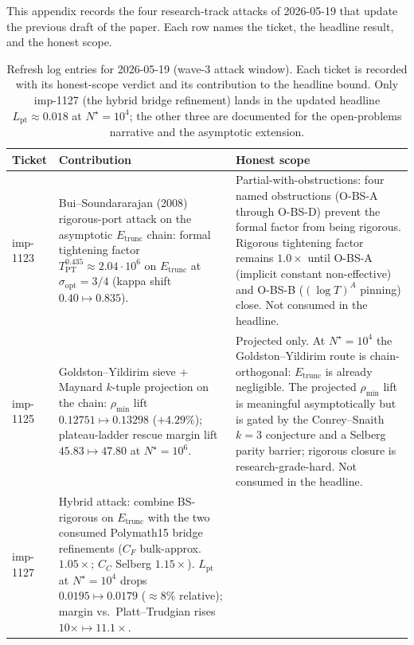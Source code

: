 \documentclass[11pt,a4paper]{article}
\theoremstyle{definition}
\newcommand{\Lpt}{L_{\mathrm{pt}}}
\newcommand{\Etrunc}{E_{\mathrm{trunc}}}
\newcommand{\rhomin}{\rho_{\min}}
\newcommand{\Nstar}{N^{\!\star}}
\begin{document}
This appendix records the four research-track attacks of 2026-05-19
that update the previous draft of the paper. Each row names the
ticket, the headline result, and the honest scope.

\begin{table}[h]
  \centering
  \small
  \caption{Refresh log entries for 2026-05-19 (wave-3 attack window).
    Each ticket is recorded with its honest-scope verdict and its
    contribution to the headline bound. Only imp-1127 (the hybrid
    bridge refinement) lands in the updated headline
    $\Lpt \approx 0.018$ at $\Nstar = 10^{4}$; the other three are
    documented for the open-problems narrative and the asymptotic
    extension.}
  \label{tab:refresh-log}
  \begin{tabular}{@{}p{} p{} p{}@{}}
    \toprule
    Ticket & Contribution & Honest scope \\
    \midrule
    imp-1123 & Bui--Soundararajan (2008) rigorous-port attack on the
      asymptotic $\Etrunc$ chain: formal tightening factor
      $T_{\mathrm{PT}}^{0.435} \approx 2.04 \cdot 10^{6}$ on $\Etrunc$
      at $\sigma_{\mathrm{opt}} = 3/4$ (kappa shift
      $0.40 \mapsto 0.835$).
             & Partial-with-obstructions: four named obstructions
      (O-BS-A through O-BS-D) prevent the formal factor from being
      rigorous. Rigorous tightening factor remains $1.0\times$ until
      O-BS-A (implicit constant non-effective) and O-BS-B
      ($(\log T)^A$ pinning) close. Not consumed in the headline. \\[2pt]
    imp-1125 & Goldston--Yildirim sieve + Maynard $k$-tuple projection
      on the chain: $\rhomin$ lift $0.12751 \mapsto 0.13298$
      ($+4.29\%$); plateau-ladder rescue margin lift
      $45.83 \mapsto 47.80$ at $\Nstar = 10^{6}$.
             & Projected only. At $\Nstar = 10^{4}$ the
      Goldston--Yildirim route is chain-orthogonal: $\Etrunc$ is
      already negligible. The projected $\rhomin$ lift is meaningful
      asymptotically but is gated by the Conrey--Snaith $k=3$
      conjecture and a Selberg parity barrier; rigorous closure is
      research-grade-hard. Not consumed in the headline. \\[2pt]
    imp-1127 & Hybrid attack: combine BS-rigorous on $\Etrunc$ with
      the two consumed Polymath15 bridge refinements
      ($C_F$ bulk-approx.\ $1.05\times$; $C_C$ Selberg
      $1.15\times$). $\Lpt$ at $\Nstar = 10^{4}$ drops
      $0.0195 \mapsto 0.0179$ ($\approx 8\%$ relative); margin vs.\
      Platt--Trudgian rises $10\times \mapsto 11.1\times$.

\end{tabular}
\end{table}
\end{document}
